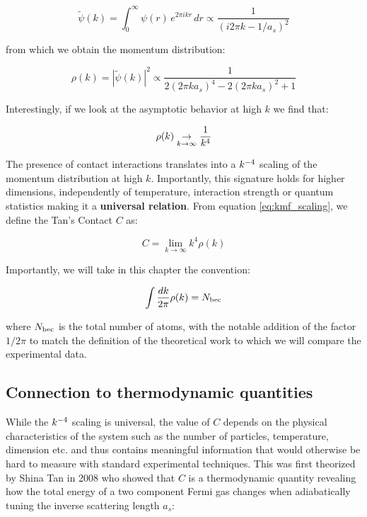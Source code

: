 \begin{equation}
    \tilde{\psi}(k) = \int_0^\infty \psi(r) \, e^{2 \pi i k r} \, dr \propto \frac{1}{(i 2 \pi k - 1/a_s)^2}
\end{equation}

\noindent from which we obtain the momentum distribution:

\begin{equation}
     \rho(k) = |\tilde{\psi}(k) |^2 \propto \frac{1}{2(2 \pi k a_s)^4 - 2(2 \pi k a_s)^2 +1}
\end{equation}

\noindent Interestingly, if we look at the asymptotic behavior at high $k$ we find that:

\begin{equation}
    \rho(k) \underrel{k \to \infty} \to \frac{1}{k^4}
    \label{eq:kmf_scaling}
\end{equation}

\noindent The presence of contact interactions translates into a $k^{-4}$ scaling of the momentum distribution at high $k$. Importantly, this signature holds for higher dimensions, independently of temperature, interaction strength or quantum statistics making it a \textbf{universal relation}. From equation \ref{eq:kmf_scaling}, we define the Tan's Contact $C$ as:

\begin{equation}
    C = \lim_{k \to \infty} k^4 \rho(k)
\end{equation}

Importantly, we will take in this chapter the convention:

\begin{equation}
    \int \frac{d k}{2 \pi} \rho(k)= N_{\rm{bec}}
\end{equation}

\noindent where $N_{\rm{bec}}$ is the total number of atoms, with the notable addition of the factor $1/2 \pi$ to match the definition of the theoretical work \cite{yao2018tan} to which we will compare the experimental data.  

\subsection{Connection to thermodynamic quantities}

While the $k^{-4}$ scaling is universal, the value of $C$ depends on the physical characteristics of the system such as the number of particles, temperature, dimension etc. and thus contains meaningful information that would otherwise be hard to measure with standard experimental techniques. This was first theorized by Shina Tan in 2008 \cite{tan2008large} who showed that $C$ is a thermodynamic quantity revealing how the total energy of a two component Fermi gas changes when adiabatically tuning the inverse scattering length $a_s$:


